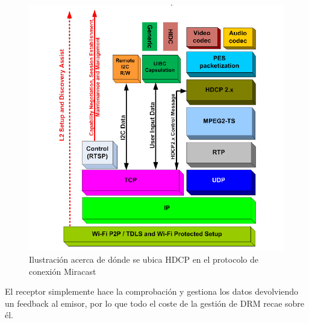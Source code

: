 \begin{figure}[ht]
  \begin{centering}
    \includegraphics[width=1.0\textwidth]{./Imagenes/HDCP_miracast_layers.png}
    \caption{Ilustración acerca de dónde se ubica HDCP en el protocolo de conexión Miracast}
  \end{centering}
\end{figure}

El receptor simplemente hace la comprobación y gestiona los datos devolviendo un feedback al emisor, por lo que todo el coste de la gestión de DRM recae sobre él.

